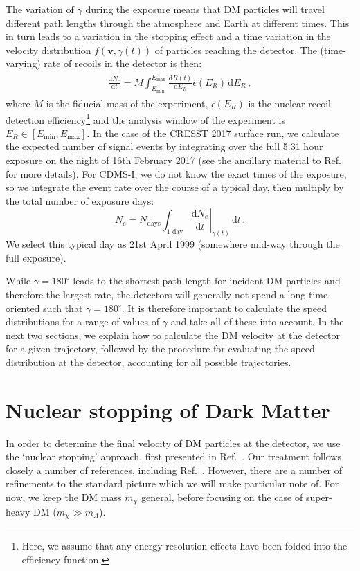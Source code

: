 \documentclass[prd,twocolumn,showpacs,nofootinbib,aps]{revtex4-1}
\newcommand{\dbd}[2]{\frac{\mathrm{d}#1}{\mathrm{d}#2}}
\begin{document}
The variation of $\gamma$ during the exposure means that DM particles will travel different path lengths through the atmosphere and Earth at different times. This in turn leads to a variation in the stopping effect and a time variation in the velocity distribution $f(\mathbf{v}, \gamma(t))$ of particles reaching the detector. The (time-varying) rate of recoils in the detector is then:
\begin{align}
\begin{split}
\dbd{N_e}{t} = M \int_{E_\mathrm{min}}^{E_\mathrm{max}} \dbd{R(t)}{E_R} \epsilon(E_R) \,\mathrm{d}E_R\,,
\end{split}
\end{align}
where $M$ is the fiducial mass of the experiment, $\epsilon(E_R)$ is the nuclear recoil detection efficiency\footnote{Here, we assume that any energy resolution effects have been folded into the efficiency function.} and the analysis window of the experiment is $E_R \in [E_\mathrm{min}, E_\mathrm{max}]$. In the case of the CRESST 2017 surface run, we calculate the expected number of signal events by integrating over the full 5.31 hour exposure on the night of 16th February 2017 (see the ancillary material to Ref.~\cite{Angloher:2017sxg} for more details). For CDMS-I, we do not know the exact times of the exposure, so we integrate the event rate over the course of a typical day, then multiply by the total number of exposure days:
\begin{equation}
\label{eq:Nexp}
N_e = N_\mathrm{days} \int_{\mathrm{1\,\,day}} \left.\dbd{N_e}{t}\right|_{ \gamma(t)} \,\mathrm{d}t\,.
\end{equation}
We select this typical day as 21st April 1999 (somewhere mid-way through the full exposure). 

While $\gamma = 180^\circ$ leads to the shortest path length for incident DM particles and therefore the largest rate, the detectors will generally not spend a long time oriented such that $\gamma = 180^\circ$. It is therefore important to calculate the speed distributions for a range of values of $\gamma$ and take all of these into account. In the next two sections, we explain how to calculate the DM velocity at the detector for a given trajectory, followed by the procedure for evaluating the speed distribution at the detector, accounting for all possible trajectories.


\section{Nuclear stopping of Dark Matter}
\label{sec:NuclearStopping}
In order to determine the final velocity of DM particles at the detector, we use the `nuclear stopping' approach, first presented in Ref.~\cite{Starkman:1990nj}. Our treatment follows closely a number of references, including Ref.~\cite{Davis:2017noy}. However, there are a number of refinements to the standard picture which we will make particular note of. For now, we keep the DM mass $m_\chi$ general, before focusing on the case of super-heavy DM ($m_\chi \gg m_A$).
\end{document}

